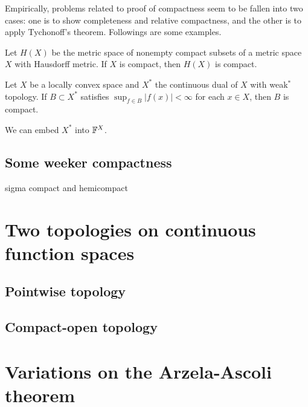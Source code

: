 \documentclass{../exp}
\begin{document}
Empirically, problems related to proof of compactness seem to be fallen into two cases: one is to show completeness and relative compactness, and the other is to apply Tychonoff's theorem.
Followings are some examples.
\begin{ex}

\end{ex}
\begin{ex}
Let $H(X)$ be the metric space of nonempty compact subsets of a metric space $X$ with Hausdorff metric.
If $X$ is compact, then $H(X)$ is compact.
\end{ex}

\begin{ex}
Let $X$ be a locally convex space and $X^*$ the continuous dual of $X$ with weak$^*$ topology.
If $B\subset X^*$ satisfies $\sup_{f\in B}|f(x)|<\infty$ for each $x\in X$, then $B$ is compact.
\end{ex}
\begin{pf}
We can embed $X^*$ into $\mathbb{F}^X$.
\end{pf}

\subsection{Some weeker compactness}
sigma compact and hemicompact







\section{Two topologies on continuous function spaces}
\subsection{Pointwise topology}

\subsection{Compact-open topology}











\section{Variations on the Arzela-Ascoli theorem}
\end{document}

